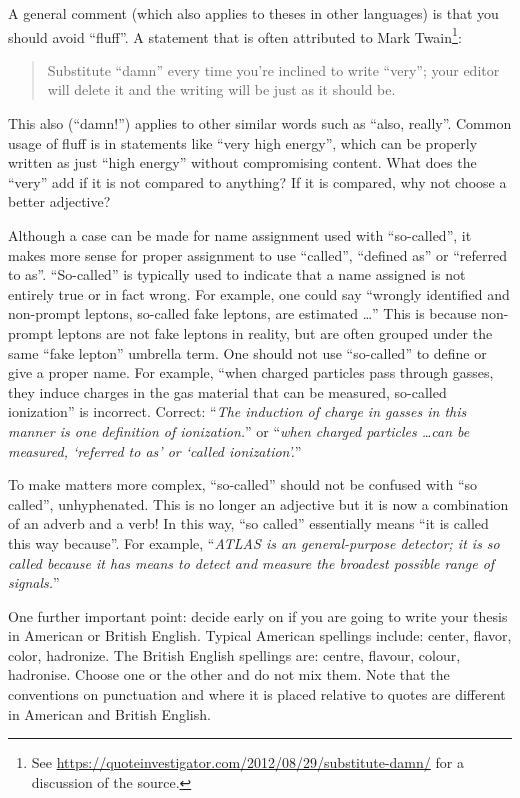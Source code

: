 A general comment (which also applies to theses in other languages) is that you should avoid \enquote{fluff}.
A statement that is often attributed to Mark Twain\footnote{%
See \url{https://quoteinvestigator.com/2012/08/29/substitute-damn/} for a discussion of the source.}:
\begin{quote}
  Substitute \enquote{damn} every time you're inclined to write \enquote{very};
  your editor will delete it and the writing will be just as it should be.
\end{quote}
This also (\enquote{damn!}) applies to other similar words such as \enquote{also, really}.
Common usage of fluff is in statements like \enquote{very high energy},
which can be properly written as just \enquote{high energy} without compromising content.
What does the \enquote{very} add if it is not compared to anything?
If it is compared, why not choose a better adjective?

Although a case can be made for name assignment used with \enquote{so-called},
it makes more sense for proper assignment to use
\enquote{called}, \enquote{defined as} or \enquote{referred to as}.
\enquote{So-called} is typically used to indicate that a name assigned is not entirely true or in fact wrong.
For example, one could say \enquote{wrongly identified and non-prompt leptons,
so-called fake leptons, are estimated \ldots}
This is because non-prompt leptons are not fake leptons in reality,
but are often grouped under the same \enquote{fake lepton} umbrella term.
One should not use \enquote{so-called} to define or give a proper name.
For example, \enquote{when charged particles pass through gasses,
they induce charges in the gas material that can be measured, so-called ionization} is incorrect.
Correct: \enquote{\emph{The induction of charge in gasses in this manner 
is one definition of ionization.}}
or \enquote{\emph{when charged particles \ldots can be measured,
\enquote{referred to as} or \enquote{called ionization}.}}
 
To  make matters more complex, \enquote{so-called} should not be confused with \enquote{so called}, unhyphenated.
This is no longer an adjective but it is now a combination of an adverb and a verb!
In this way, \enquote{so called} essentially means \enquote{it is called this way because}.
For example, \enquote{\emph{ATLAS is an general-purpose detector;
  it is so called because it has means to detect and measure the broadest possible range of signals.}}

One further important point: decide early on if you are going to write your thesis in American or British English.
Typical American spellings include: \foreignlanguage{USenglish}{center, flavor, color, hadronize}.
The British English spellings are: centre, flavour, colour, hadronise.
Choose one or the other and do not mix them.
Note that the conventions on punctuation and where it is placed relative to quotes
are different in American and British English.

